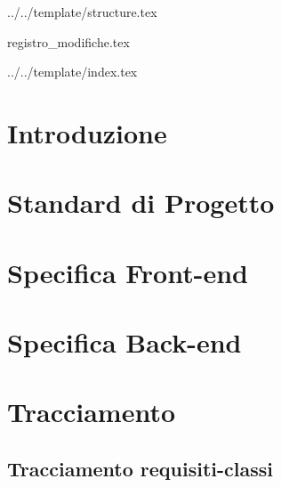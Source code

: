 


\def\DOCUMENTO{Definizione di Prodotto}
\def\VERSIONE{1.0.0}

\def\DESCRIZIONE{Documento che definisce in dettaglio l'architettura del prodotto \PROGETTO.}

\def\REDATTORE {Burlin Valerio \\ & Carraro Nicola \\ & Suierica Bogdan \\ & Ros Fabio}
\def\VERIFICATORE {Agostinetto Matteo}
\def\RESPONSABILE {Suierica Bogdan}

\def\USO {Esterno}

\def\DISTRIBUZIONE {\GRUPPO{}\\ & \COMMITTENTE{}\\ & \PROPONENTE{}\\}

\def\DESCRIZIONE {Documento che definisce in dettaglio l'architettura del prodotto \PROGETTO.}

\def\SCOPE {\textit{\$scope}}


\def\INDICE	{true}
\def\TABELLE {false}
\def\FIGURE {true}


 {../../template/structure.tex}

 {registro_modifiche.tex}

 {../../template/index.tex}


\section{Introduzione}

\newpage

\section{Standard di Progetto}

\newpage

\section{Specifica Front-end}

\newpage

\section{Specifica Back-end}

\newpage

\section{Tracciamento}
\subsection{Tracciamento requisiti-classi}

\newpage



